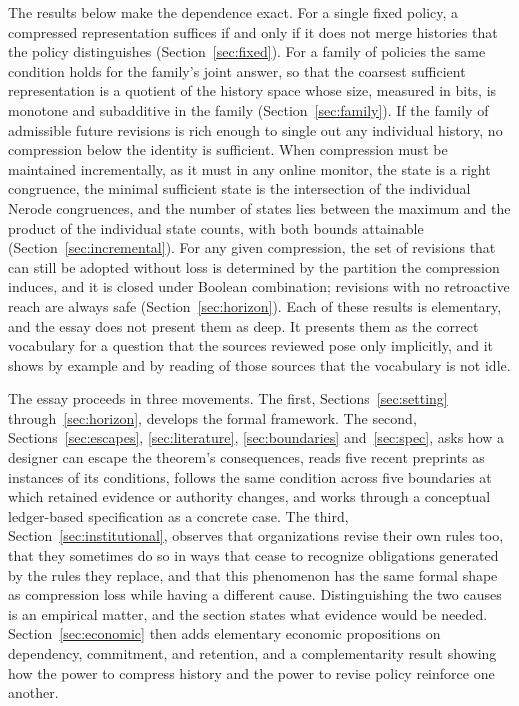 \documentclass[11pt]{article}
\theoremstyle{definition}
\theoremstyle{remark}
\begin{document}
The results below make the dependence exact. For a single fixed policy, a compressed representation suffices if and only if it does not merge histories that the policy distinguishes (Section~\ref{sec:fixed}). For a family of policies the same condition holds for the family's joint answer, so that the coarsest sufficient representation is a quotient of the history space whose size, measured in bits, is monotone and subadditive in the family (Section~\ref{sec:family}). If the family of admissible future revisions is rich enough to single out any individual history, no compression below the identity is sufficient. When compression must be maintained incrementally, as it must in any online monitor, the state is a right congruence, the minimal sufficient state is the intersection of the individual Nerode congruences, and the number of states lies between the maximum and the product of the individual state counts, with both bounds attainable (Section~\ref{sec:incremental}). For any given compression, the set of revisions that can still be adopted without loss is determined by the partition the compression induces, and it is closed under Boolean combination; revisions with no retroactive reach are always safe (Section~\ref{sec:horizon}). Each of these results is elementary, and the essay does not present them as deep. It presents them as the correct vocabulary for a question that the sources reviewed pose only implicitly, and it shows by example and by reading of those sources that the vocabulary is not idle.

The essay proceeds in three movements. The first, Sections~\ref{sec:setting} through~\ref{sec:horizon}, develops the formal framework. The second, Sections~\ref{sec:escapes}, \ref{sec:literature}, \ref{sec:boundaries} and~\ref{sec:spec}, asks how a designer can escape the theorem's consequences, reads five recent preprints as instances of its conditions, follows the same condition across five boundaries at which retained evidence or authority changes, and works through a conceptual ledger-based specification as a concrete case. The third, Section~\ref{sec:institutional}, observes that organizations revise their own rules too, that they sometimes do so in ways that cease to recognize obligations generated by the rules they replace, and that this phenomenon has the same formal shape as compression loss while having a different cause. Distinguishing the two causes is an empirical matter, and the section states what evidence would be needed. Section~\ref{sec:economic} then adds elementary economic propositions on dependency, commitment, and retention, and a complementarity result showing how the power to compress history and the power to revise policy reinforce one another.
\end{document}
